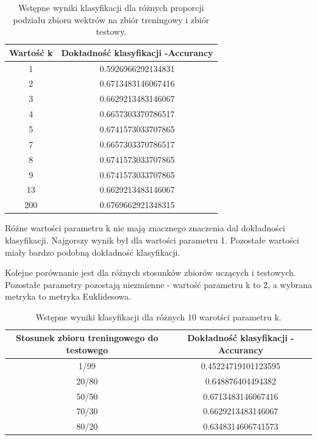 \documentclass{classrep}
\begin{document}
\begin{table}[h!]
 \caption{Wstępne wyniki klasyfikacji dla różnych proporcji podziału zbioru wektrów na zbiór treningowy i zbiór testowy.}
 \centering
 \vspace{0.1cm}
 \begin{tabular}{c c}
  \textbf{Wartość k} & \textbf{Dokładność klasyfikacji -Accurancy}\\
\hline
  1 &  0.5926966292134831\\
  2 &   0.6713483146067416\\
  3 &  0.6629213483146067\\
  4 &  0.6657303370786517\\
  5 &  0.6741573033707865\\
  7 & 0.6657303370786517\\
  8 &  0.6741573033707865\\
  9 &   0.6741573033707865\\
 13  & 0.6629213483146067\\
200 &   0.6769662921348315 \\
 \end{tabular}
 \label{wyniki klasyfikacji dla różnych proporcji podziału zbioru wektrów na zbiór treningowy i zbiór testowy.}
\end{table}

Różne wartości parametru k nie mają znacznego znaczenia dal dokładności klasyfikacji. Najgorszy wynik był dla wartości parametru 1. Pozostałe wartości miały bardzo podobną dokładność klasyfikacji. 

\newpage
Kolejne porównanie jest dla różnych stosunków zbiorów uczących i testowych. Pozostałe parametry pozostają niezmienne - wartość parametru k to 2, a wybrana metryka to metryka Euklidesowa.


\begin{table}[h!]
 \caption{Wstępne wyniki klasyfikacji dla różnych 10 warotści parametru k.}
 \centering
 \vspace{0.1cm}
 \begin{tabular}{c c}
  \textbf{Stosunek zbioru treningowego do testowego} & \textbf{Dokładność klasyfikacji -Accurancy}\\
\hline
  1/99 & 0.45224719101123595\\
  20/80 &  0.648876404494382\\
  50/50 &  0.6713483146067416\\
  70/30 &  0.6629213483146067\\
  80/20 &  0.6348314606741573\\
 \end{tabular}
 \label{wyniki klasyfikacji dla roznych 10 wartosci parametru k}
\end{table}
\end{document}
